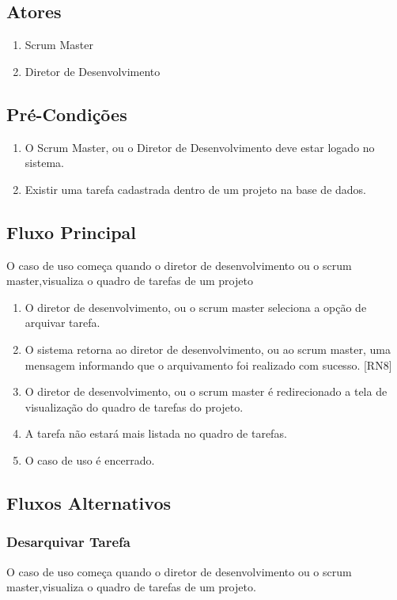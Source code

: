 \subsection{Atores}

\begin{enumerate}
  \item Scrum Master
  \item Diretor de Desenvolvimento
\end{enumerate}

\subsection{Pré-Condições}
\begin{enumerate}
  \item O Scrum Master, ou o Diretor de Desenvolvimento deve estar logado no sistema.
  \item Existir uma tarefa cadastrada dentro de um projeto na base de dados.
\end{enumerate}

\subsection{Fluxo Principal}
O caso de uso começa quando o diretor de desenvolvimento ou o scrum master,visualiza o quadro de tarefas de um projeto

\begin{enumerate}
  \item O diretor de desenvolvimento, ou o scrum master seleciona a opção de arquivar tarefa.
  \item O sistema retorna ao diretor de desenvolvimento, ou ao scrum master, uma mensagem informando que o arquivamento foi realizado com sucesso. [RN8]
  \item O diretor de desenvolvimento, ou o scrum master é redirecionado a tela de visualização do quadro de tarefas do projeto.
  \item A tarefa não estará mais listada no quadro de tarefas.
  \item O caso de uso é encerrado.
\end{enumerate}

\subsection{Fluxos Alternativos}

\subsubsection{Desarquivar Tarefa}
O caso de uso começa quando o diretor de desenvolvimento ou o scrum master,visualiza o quadro de tarefas de um projeto.

